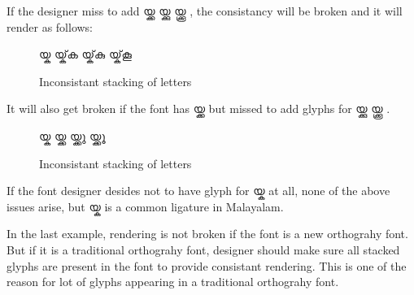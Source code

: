 \begin{enumerate}
If the designer miss to add {\meera യ്ക്ക യ്ക്കു യ്ക്കൂ }, the consistancy will 
be broken and it will render as follows:
\begin{figure}[h]
  \centering
  {\meera\textexample യ്ക യ്ക്‌ക യ്ക്‌കു യ്ക്‌കൂ }\\
  \caption{Inconsistant stacking of letters}
\end{figure}

It will also get broken if the font has  {\meera യ്ക്ക} but missed to add 
glyphs for {\meera യ്ക്കു യ്ക്കൂ }.

\begin{figure}[h]
  \centering
  {\meera\textexample യ്ക യ്ക്ക യ്ക്ക‌ു യ്ക്ക‌ൂ }\\
  \caption{Inconsistant stacking of letters}
\end{figure}

If the font designer desides not to have glyph for {\meera യ്ക } at  all, none 
of the above issues arise, but  {\meera യ്ക } is a common ligature in Malayalam.

In the last example, rendering is not broken if the font is a new orthograhy 
font. But if it is a traditional orthograhy font, designer should make sure all 
stacked glyphs are present in the font to provide consistant rendering. This is 
one of the reason for lot of glyphs appearing in a traditional orthograhy font.
\end{enumerate}

